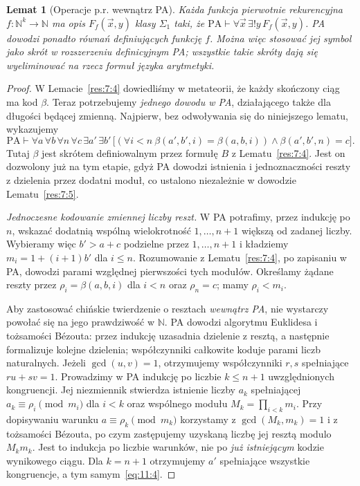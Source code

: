 \documentclass[11pt,a4paper]{article}
\numberwithin{equation}{section}
\newcommand{\N}{\mathbb N}
\newcommand{\PA}{\mathrm{PA}}
\theoremstyle{plain}
\newtheorem{lemat}[twierdzenie]{Lemat}
\theoremstyle{definition}
\theoremstyle{remark}
\begin{document}
\begin{lemat}[Operacje p.r. wewnątrz PA]\label{res:11:3}
Każda funkcja pierwotnie rekurencyjna $f:\N^k\to\N$ ma opis $F_f(\vec x,y)$ klasy $\Sigma_1$ taki, że
$\PA\vdash\forall\vec x\,\exists!y\,F_f(\vec x,y)$.
PA dowodzi ponadto równań definiujących funkcję $f$. Można więc stosować jej symbol jako skrót w rozszerzeniu definicyjnym PA; wszystkie takie skróty dają się wyeliminować na rzecz formuł języka arytmetyki.
\end{lemat}
\begin{proof}
W Lemacie~\ref{res:7:4} dowiedliśmy w metateorii, że każdy skończony ciąg ma kod $\beta$. Teraz potrzebujemy \emph{jednego dowodu w PA}, działającego także dla długości będącej zmienną. Najpierw, bez odwoływania się do niniejszego lematu, wykazujemy
\begin{equation}\label{eq:11:4}
\PA\vdash\forall a\,\forall b\,\forall n\,\forall c\,\exists a'\,\exists b'\,
\bigl[(\forall i<n\ \beta(a',b',i)=\beta(a,b,i))
\land\beta(a',b',n)=c\bigr].
\end{equation}
Tutaj $\beta$ jest skrótem definiowalnym przez formułę $B$ z Lematu~\ref{res:7:4}. Jest on dozwolony już na tym etapie, gdyż PA dowodzi istnienia i jednoznaczności reszty z dzielenia przez dodatni moduł, co ustalono niezależnie w dowodzie Lematu~\ref{res:7:5}.

\emph{Jednoczesne kodowanie zmiennej liczby reszt.} W PA potrafimy, przez indukcję po $n$, wskazać dodatnią wspólną wielokrotność $1,\ldots,n+1$ większą od zadanej liczby. Wybieramy więc $b'>a+c$ podzielne przez $1,\ldots,n+1$ i kładziemy $m_i=1+(i+1)b'$ dla $i\le n$. Rozumowanie z Lematu~\ref{res:7:4}, po zapisaniu w PA, dowodzi parami względnej pierwszości tych modułów. Określamy żądane reszty przez $\rho_i=\beta(a,b,i)$ dla $i<n$ oraz $\rho_n=c$; mamy $\rho_i<m_i$.

Aby zastosować chińskie twierdzenie o resztach \emph{wewnątrz PA}, nie wystarczy powołać się na jego prawdziwość w $\N$. PA dowodzi algorytmu Euklidesa i tożsamości Bézouta: przez indukcję uzasadnia dzielenie z resztą, a następnie formalizuje kolejne dzielenia; współczynniki całkowite koduje parami liczb naturalnych. Jeżeli $\gcd(u,v)=1$, otrzymujemy współczynniki $r,s$ spełniające $ru+sv=1$. Prowadzimy w PA indukcję po liczbie $k\le n+1$ uwzględnionych kongruencji. Jej niezmiennik stwierdza istnienie liczby $a_k$ spełniającej $a_k\equiv\rho_i\pmod{m_i}$ dla $i<k$ oraz wspólnego modułu $M_k=\prod_{i<k}m_i$. Przy dopisywaniu warunku $a\equiv\rho_k\pmod{m_k}$ korzystamy z $\gcd(M_k,m_k)=1$ i z tożsamości Bézouta, po czym zastępujemy uzyskaną liczbę jej resztą modulo $M_km_k$. Jest to indukcja po liczbie warunków, nie po \emph{już istniejącym} kodzie wynikowego ciągu. Dla $k=n+1$ otrzymujemy $a'$ spełniające wszystkie kongruencje, a tym samym~\eqref{eq:11:4}.


\end{proof}
\end{document}
